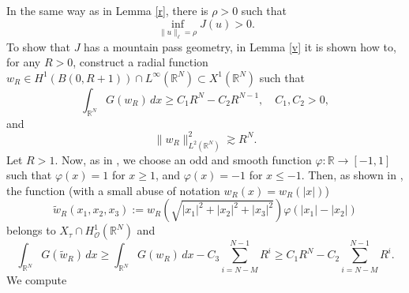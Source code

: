 \documentclass[12pt,leqno,twoside,sort]{amsart}
\newcommand{\R}{\mathbb{R}}
\numberwithin{equation}{section}
\begin{document}
In the same way as in Lemma \ref{r}, there is $\rho > 0$ such that
$$
\inf_{\|u\|_\ell = \rho} J(u) > 0.
$$
To show that $J$ has a mountain pass geometry, in Lemma \ref{v} it is shown how to, for any $R > 0$, construct a radial function $w_R \in H^1(B(0,R+1)) \cap L^\infty (\R^N) \subset X^1 (\R^N)$ such that 
$$
\int_{\R^N} G(w_R) \, dx \geq C_1 R^N - C_2 R^{N-1}, \quad C_1, C_2 > 0,
$$
and
$$
\|w_R\|_{L^2 (\R^N)}^2 \gtrsim R^N.
$$
Let $R > 1$. Now, as in \cite[Remark 4.2]{MR4173560}, we choose an odd and smooth function $\varphi : \R \rightarrow [-1,1]$ such that $\varphi(x) = 1$ for $x \geq 1$, and $\varphi(x) = -1$ for $x \leq -1$. Then, as shown in \cite[Remark 4.2]{MR4173560}, the function (with a small abuse of notation $w_R (x) = w_R( |x| )$) 
$$
\widetilde{w}_R (x_1, x_2, x_3) := w_R ( \sqrt{|x_1|^2+ |x_2|^2+ |x_3|^2}) \varphi(|x_1|-|x_2|)
$$
belongs to $X_\tau \cap H^1_{\mathcal{O}} (\R^N)$ and
$$
\int_{\R^N} G(\widetilde{w}_R) \, dx \geq \int_{\R^N} G(w_R) \, dx - C_3 \sum_{i=N-M}^{N-1} R^i \geq C_1 R^N - C_2 \sum_{i=N-M}^{N-1} R^i.
$$
We compute
\end{document}
